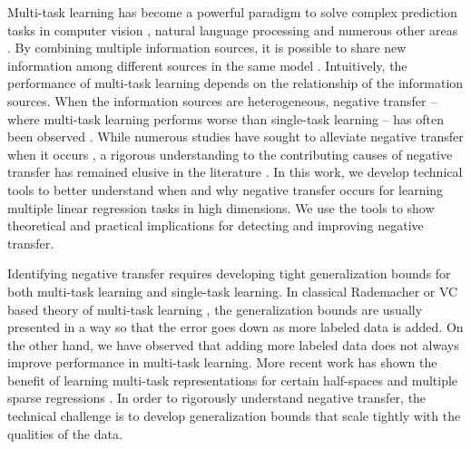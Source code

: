 Multi-task learning has become a powerful paradigm to solve complex prediction tasks in computer vision \cite{chexnet17,ZSSGM18}, natural language processing \cite{GLUE,superglue} and numerous other areas \cite{ZY17}.
By combining multiple information sources, it is possible to share new information among different sources in the same model \cite{C97}.
Intuitively, the performance of multi-task learning depends on the relationship of the information sources.
When the information sources are heterogeneous, negative transfer -- where multi-task learning performs worse than single-task learning -- has often been observed \cite{AP16,BS17}.
While numerous studies have sought to alleviate negative transfer when it occurs \cite{YKGLHF20}, a rigorous understanding to the contributing causes of negative transfer has remained elusive in the literature \cite{R17}.
In this work, we develop technical tools to better understand when and why negative transfer occurs for learning multiple linear regression tasks in high dimensions. %
We use the tools to show theoretical and practical implications for detecting and improving negative transfer.

Identifying negative transfer requires developing tight generalization bounds for both multi-task learning and single-task learning.
In classical Rademacher or VC based theory of multi-task learning \cite{B00,AZ05,M06}, the generalization bounds are usually presented in a way so that the error goes down as more labeled data is added.
On the other hand, we have observed that adding more labeled data does not always improve performance in multi-task learning.
More recent work has shown the benefit of learning multi-task representations for certain half-spaces \cite{MPR16} and multiple sparse regressions \cite{LPTV09,LPVT11}.
In order to rigorously understand negative transfer, the technical challenge is to develop generalization bounds that scale tightly with the qualities of the data.

